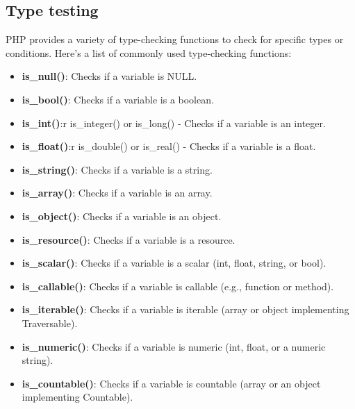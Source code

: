 \documentclass{report}
\begin{document}
\bigbreak \noindent 
\subsection{Type testing}
\bigbreak \noindent 
PHP provides a variety of type-checking functions to check for specific types or conditions. Here’s a list of commonly used type-checking functions:
\begin{itemize}
    \item \textbf{is\_null()}: Checks if a variable is NULL.
    \item \textbf{is\_bool()}: Checks if a variable is a boolean.
    \item \textbf{is\_int()}:r is\_integer() or is\_long() - Checks if a variable is an integer.
    \item \textbf{is\_float()}:r is\_double() or is\_real() - Checks if a variable is a float.
    \item \textbf{is\_string()}: Checks if a variable is a string.
    \item \textbf{is\_array()}: Checks if a variable is an array.
    \item \textbf{is\_object()}: Checks if a variable is an object.
    \item \textbf{is\_resource()}: Checks if a variable is a resource.
    \item \textbf{is\_scalar()}: Checks if a variable is a scalar (int, float, string, or bool).
    \item \textbf{is\_callable()}: Checks if a variable is callable (e.g., function or method).
    \item \textbf{is\_iterable()}: Checks if a variable is iterable (array or object implementing Traversable).
    \item \textbf{is\_numeric()}: Checks if a variable is numeric (int, float, or a numeric string).
    \item \textbf{is\_countable()}: Checks if a variable is countable (array or an object implementing Countable).
\end{itemize}

\bigbreak \noindent 
\end{document}
